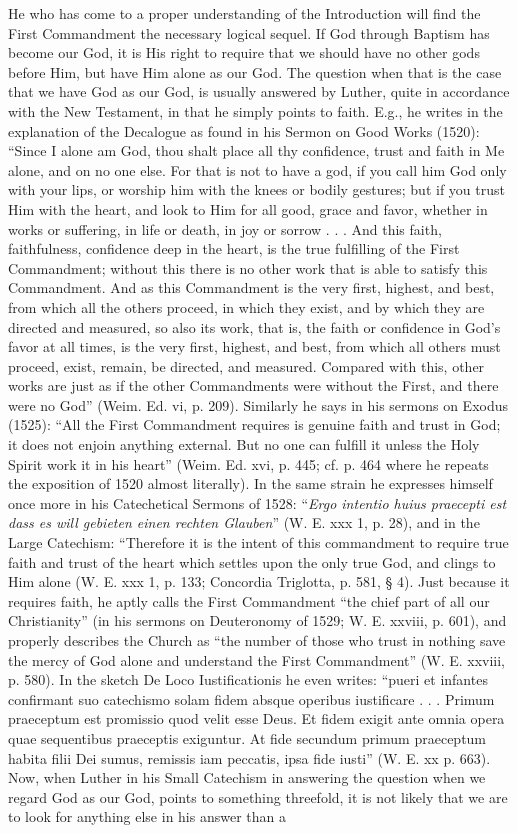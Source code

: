 He who has come to a proper understanding of the Introduction will find the First Commandment the necessary logical sequel. If God through Baptism has become our God, it is His right to require that we should have no other gods before Him, but have Him alone as our God. The question when that is the case that we have God as our God, is usually answered by Luther, quite in accordance with the New Testament, in that he simply points to faith. E.g., he writes in the explanation of the Decalogue as found in his Sermon on Good Works (1520): “Since I alone am God, thou shalt place all thy confidence, trust and faith in Me alone, and on no one else. For that is not to have a god, if you call him God only with your lips, or worship him with
the knees or bodily gestures; but if you trust Him with the heart, and look to Him for all good, grace and favor, whether in works or suffering, in life or death, in joy or sorrow . . . And this faith, faithfulness, confidence deep in the heart, is the true fulfilling of the First Commandment; without this there is no other work that is able to satisfy this Commandment. And as this Commandment is the very first, highest, and best, from which all the others proceed, in which they exist, and by which they are directed and measured, so also its work, that is, the faith or confidence in God’s favor at all times, is the very first, highest, and best, from which all others must proceed, exist, remain, be directed, and measured. Compared with this, other works are just as if the other Commandments were without the First, and there were no God” (Weim. Ed. vi, p. 209). Similarly he says in his sermons on Exodus (1525): “All the First Commandment requires is genuine faith and trust in God; it does not enjoin anything external. But no one can fulfill it unless the Holy Spirit work it in his heart” (Weim. Ed. xvi, p. 445; cf. p. 464 where he repeats the exposition of 1520 almost literally). In the same strain he expresses himself once more in his Catechetical Sermons of 1528: “\emph{Ergo intentio huius praecepti est dass es will gebieten einen rechten Glauben}” (W. E. xxx 1, p. 28), and in the Large Catechism: “Therefore it is the intent of this commandment to require true faith and trust of the heart which settles upon the only true God, and clings to Him alone (W. E. xxx 1, p. 133; Concordia Triglotta, p. 581, § 4). Just because it requires faith, he aptly calls the First Commandment “the chief part of all our Christianity” (in his sermons on Deuteronomy of 1529; W. E. xxviii, p. 601), and properly describes the Church as “the number of those who trust in nothing save the mercy of God alone and understand the First Commandment” (W. E. xxviii, p. 580). In the sketch De Loco Iustificationis he even writes: “pueri et infantes confirmant suo catechismo solam fidem absque operibus iustificare . . . Primum praeceptum est promissio quod velit esse Deus. Et fidem exigit ante omnia opera quae sequentibus praeceptis exiguntur. At fide secundum primum praeceptum habita filii Dei sumus, remissis iam peccatis, ipsa fide iusti” (W. E. xx p. 663). Now, when Luther in his Small Catechism in answering the question when we regard God as our God, points to something threefold, it is not likely that we are to look for anything else in his answer than a 